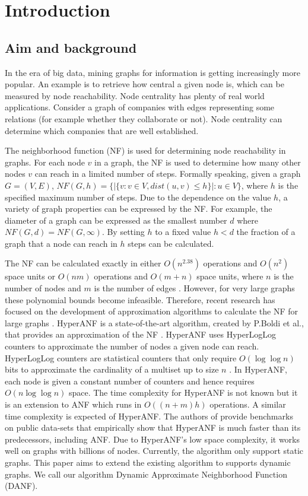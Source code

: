\chapter{Introduction}

\section{Aim and background}
In the era of big data, mining graphs for information is getting increasingly more popular. An example is to retrieve how central a given node is, which can be measured by node reachability. Node centrality has plenty of real world applications. Consider a graph of companies with edges representing some relations (for example whether they collaborate or not). Node centrality can determine which companies that are well established. 

The neighborhood function (NF) is used for determining node reachability in graphs. For each node $v$ in a graph, the NF is used to determine how many other nodes $v$ can reach in a limited number of steps. Formally speaking, given a graph $G = (V,E)$, $NF(G,h) = \{|\{v : v \in V, dist(u,v) \leq h \}| : u \in V\}$, where $h$ is the specified maximum number of steps. Due to the dependence on the value $h$, a variety of graph properties can be expressed by the NF. For example, the diameter of a graph can be expressed as the smallest number $d$ where $NF(G,d) = NF(G,\infty)$. By setting $h$ to a fixed value $h < d$ the fraction of a graph that a node can reach in $h$ steps can be calculated.

The NF can be calculated exactly in either $O(n^{2.38})$ operations and $O(n^2)$ space units or $O(nm)$ operations and $O(m + n)$ space units, where $n$ is the number of nodes and $m$ is the number of edges \cite{Palmer01}. However, for very large graphs these polynomial bounds become infeasible. Therefore, recent research has focused on the development of approximation algorithms to calculate the NF for large graphs \cite{Palmer01,hyperanf,anf}. HyperANF is a state-of-the-art algorithm, created by P.Boldi et al., that provides an approximation of the NF \cite{hyperanf}. HyperANF uses HyperLogLog counters to approximate the number of nodes a given node can reach. HyperLogLog counters are statistical counters that only require $O( \log\log n)$ bits to approximate the cardinality of a multiset up to size $n$ \cite{hyperloglog}. In HyperANF, each node is given a constant number of counters and hence requires $O(n \log\log n)$ space. The time complexity for HyperANF is not known but it is an extension to ANF which runs in $O((n+m)h)$ operations. A similar time complexity is expected of HyperANF. The authors of \cite{hyperanf} provide benchmarks on public data-sets that empirically show that HyperANF is much faster than its predecessors, including ANF. Due to HyperANF's low space complexity, it works well on graphs with billions of nodes. Currently, the algorithm only support  static graphs. This paper aims to extend the existing algorithm to supports dynamic graphs. We call our algorithm Dynamic Approximate Neighborhood Function (DANF).

